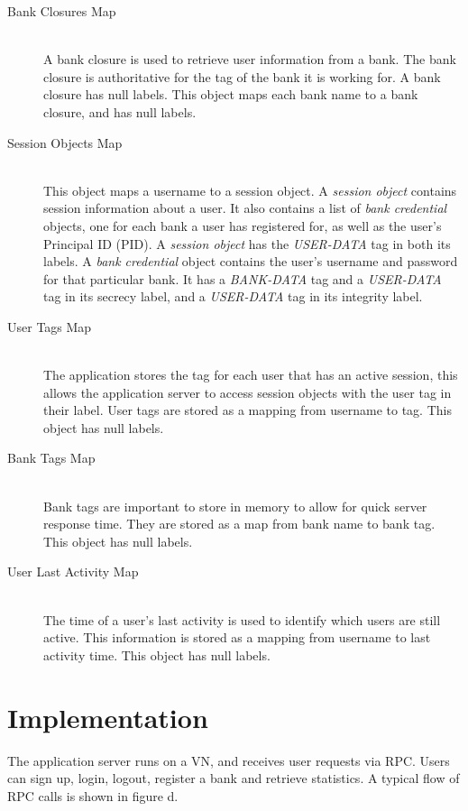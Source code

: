 \begin{description}
  \item[Bank Closures Map] \ \\
    A bank closure is used to retrieve user
    information from a bank. The bank closure
    is authoritative for the tag of the bank
    it is working for. A bank closure has null
    labels.
    This object maps each bank name 
    to a bank closure, and has null labels.
  \item[Session Objects Map] \ \\
    This object maps a username to a session 
    object.
    A \emph{session object} contains session 
    information about a user. It also contains
    a list of \emph{bank credential} objects,
    one for each bank a user has registered 
    for, as well as the user's Principal ID
    (PID). 
    A \emph{session object} has the 
    \emph{USER-DATA} tag in both its labels.
    A \emph{bank credential} object contains 
    the user's username and password for that
    particular bank. It has a \emph{BANK-DATA}
    tag and a \emph{USER-DATA} tag in its 
    secrecy label, and a \emph{USER-DATA} tag
    in its integrity label.
  \item[User Tags Map] \ \\
    The application stores the tag for each user 
    that has an active session, this allows the 
    application server to access session objects 
    with the user tag in their label. User tags 
    are stored as a mapping from username to tag.
    This object has null labels.
  \item[Bank Tags Map] \ \\
    Bank tags are important to store in memory to 
    allow for quick server response time. They are 
    stored as a map from bank name to bank tag.
    This object has null labels.
  \item[User Last Activity Map] \ \\
    The time of a user's last activity 
    is used to identify which users
    are still active. This information is stored 
    as a mapping from username to last activity 
    time.
    This object has null labels.
\end{description}

\section{Implementation}

The application server runs on a VN, and receives user requests via RPC. Users can sign up, login, logout, register a bank and retrieve statistics. A typical flow of RPC calls is shown in figure d. 

